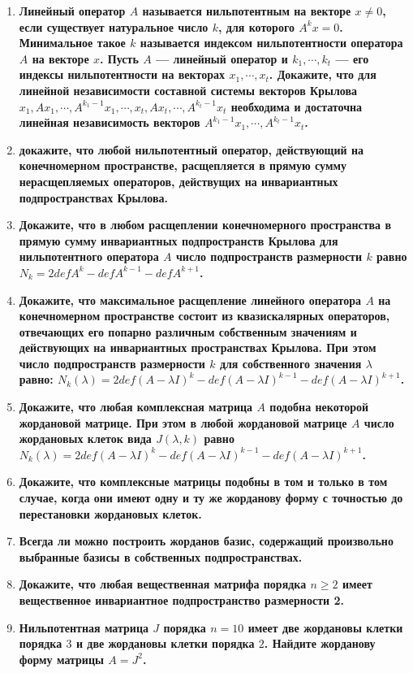 \documentclass[12pt]{article} %
\begin{document}
\begin{enumerate}
    \item \textbf{Линейный оператор $A$ называется нильпотентным на векторе $x \neq 0$, если существует натуральное число $k$, для которого $A^kx = 0$. Минимальное такое $k$ называется индексом нильпотентности оператора $A$  на векторе $x$. Пусть $A$ --- линейный оператор и $k_1, \cdots, k_t$ --- его индексы нильпотентности на векторах $x_1, \cdots, x_t$. Докажите, что для линейной независимости составной системы векторов Крылова $x_1, Ax_1, \cdots, A^{k_1 - 1}x_1, \cdots , x_t, Ax_t, \cdots, A^{k_t - 1}x_t$ необходима и достаточна линейная независимость векторов $A^{k_1 - 1}x_1, \cdots, A^{k_t - 1}x_t$.}
    \item \textbf{докажите, что любой нильпотентный оператор, действующий на конечномерном пространстве, расщепляется в прямую сумму нерасщепляемых операторов, действущих на инвариантных подпространствах Крылова.}
    \item \textbf{Докажите, что в любом расщеплении конечномерного пространства в прямую сумму инвариантных подпространств Крылова для нильпотентного оператора $A$ число подпространств размерности $k$ равно $N_k= 2defA^k - defA^{k - 1} - defA^{k + 1}$.}
    \item \textbf{Докажите, что максимальное расщепление линейного оператора $A$ на конечномерном пространстве состоит из квазискалярных операторов, отвечающих его попарно различным собственным значениям и действующих на инвариантных пространствах Крылова. При этом число подпространств размерности $k$ для собственного значения $\lambda$ равно: $N_k(\lambda) = 2def(A - \lambda I)^k - def(A - \lambda I)^{k - 1} - def(A - \lambda I)^{k + 1}$.}
    \item \textbf{Докажите, что любая комплексная матрица $A$ подобна некоторой жордановой матрице. При этом в любой жордановой матрице $A$ число жордановых клеток вида $J(\lambda, k)$ равно $N_k(\lambda) = 2def(A - \lambda I)^k - def(A - \lambda I)^{k - 1} - def(A - \lambda I)^{k + 1}$.}
    \item \textbf{Докажите, что комплексные матрицы подобны в том и только в том случае, когда они имеют одну и ту же жорданову форму с точностью до  перестановки жордановых клеток.}
    \item \textbf{Всегда ли можно построить жорданов базис, содержащий произвольно выбранные базисы в собственных подпространствах.}
    \item \textbf{Докажите, что любая вещественная матрифа порядка $n \geqslant 2$ имеет вещественное инвариантное подпространство размерности 2.}
    \item \textbf{Нильпотентная матрица $J$ порядка $n = 10$ имеет две жордановы клетки порядка $3$ и две жордановы клетки порядка $2$. Найдите жорданову форму матрицы $A = J^2$.}

\end{enumerate}
\end{document}

